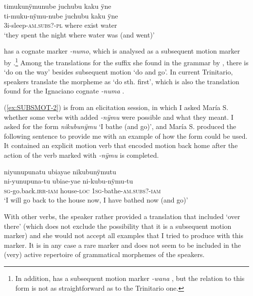 \ea\label{ex:SUBSMOT-1}
\begingl
\glpreamble timukunÿmunube juchubu kaku ÿne\\
\gla ti-muku-nÿmu-nube juchubu kaku ÿne\\
\glb 3i-sleep-\textsc{am.subs}?-\textsc{pl} where exist water\\
\glft ‘they spent the night where water was (and went)’
\endgl
\trailingcitation{[jxx-e150925l-1.197]}
\xe

 has a cognate marker \textit{-numo}, which is analysed as a subsequent motion marker by \citet[]{Rose2015}.\footnote{In addition,  has a subsequent motion marker \textit{-wana} \citep[cf.][257]{Danielsen2007}, but the relation to this form is not as straightforward as to the Trinitario one.} Among the translations for the suffix she found in the grammar by \citet[]{Marban1894}, there is ‘do on the way’ besides subsequent motion ‘do and go’. In current Trinitario, speakers translate the morpheme as ‘do sth. first’, which is also the translation found for the Ignaciano cognate \textit{-numa} \citep[141--142]{Rose2015}.

(\ref{ex:SUBSMOT-2}) is from an elicitation session, in which I asked María S. whether some verbs with added \textit{-nÿmu} were possible and what they meant. I asked for the form \textit{nikubunÿmu} ‘I bathe (and go)’, and María S. produced the following sentence to provide me with an example of how the form could be used. It contained an explicit motion verb that encoded motion back home after the action of the verb marked with \textit{-nÿmu} is completed.

\ea\label{ex:SUBSMOT-2}
\begingl
\glpreamble niyunupunatu ubiayae nikubunÿmutu\\
\gla ni-yunupuna-tu ubiae-yae ni-kubu-nÿmu-tu\\
\textsc{sg}-go.back.\textsc{irr}-\textsc{iam} house-\textsc{loc} 1\textsc{sg}-bathe-\textsc{am.subs}?-\textsc{iam}\\
\glft ‘I will go back to the house now, I have bathed now (and go)’
\endgl
\trailingcitation{[rxx-e181018le-a]}
\xe

With other verbs, the speaker rather provided a translation that included ‘over there’ (which does not exclude the possibility that it is a subsequent motion marker) and she would not accept all examples that I tried to produce with this marker. It is in any case a rare marker and does not seem to be included in the (very) active repertoire of grammatical morphemes of the speakers.


